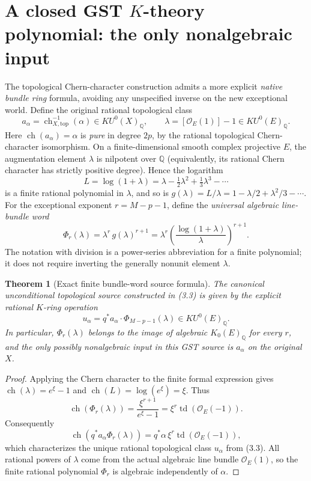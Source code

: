 \documentclass[11pt]{article}
\newcommand{\Q}{\mathbb Q}
\newcommand{\td}{\operatorname{td}}
\newcommand{\ch}{\operatorname{ch}}
\newtheorem{theorem}{Theorem}[section]
\begin{document}
\section{A closed GST \(K\)-theory polynomial: the only nonalgebraic input}
The topological Chern-character construction admits a more
explicit \emph{native bundle ring} formula, avoiding any
unspecified inverse on the new exceptional world.
Define the original rational topological class
\[
 a_\alpha=\ch_{X,\mathrm{top}}^{-1}(\alpha)
 \in KU^0(X)_\Q,\qquad
 \lambda=[\mathcal O_E(1)]-1
 \in KU^0(E)_\Q.
\]
Here \(\ch(a_\alpha)=\alpha\) is \emph{pure}
in degree \(2p\), by the rational topological
Chern-character isomorphism. On a finite-dimensional
smooth complex projective \(E\), the
augmentation element \(\lambda\) is nilpotent
over \(\Q\) (equivalently, its rational
Chern character has strictly positive degree).
Hence the logarithm
\[
 L=\log(1+\lambda)
  =\lambda-\tfrac12\lambda^2+
   \tfrac13\lambda^3-\cdots
\]
is a finite rational polynomial in
\(\lambda\), and so is
\(g(\lambda)=L/\lambda=
1-\lambda/2+\lambda^2/3-\cdots\).
For the exceptional exponent \(r=M-p-1\),
define the \emph{universal algebraic line-bundle
word}
\[
 \boxed{
 \Phi_r(\lambda)
 =\lambda^r\,g(\lambda)^{r+1}
 =\lambda^r
 \left(\frac{\log(1+\lambda)}{\lambda}\right)^{r+1}.}
 \tag{5.1}
\]
The notation with division is a power-series
abbreviation for a finite polynomial; it
does not require inverting the generally
nonunit element \(\lambda\).

\begin{theorem}[Exact finite bundle-word source formula]
The canonical unconditional topological source
constructed in (3.3) is given by the
\emph{explicit rational \(K\)-ring operation}
\[
 \boxed{
  u_\alpha=q^*a_\alpha\cdot\Phi_{M-p-1}(\lambda)
 \in KU^0(E)_\Q.}
 \tag{5.2}
\]
In particular, \(\Phi_r(\lambda)\) belongs to the image
of \emph{algebraic} \(K_0(E)_\Q\)
for every \(r\), and the only possibly
nonalgebraic input in this GST source is
\(a_\alpha\) on the original \(X\).
\end{theorem}
\begin{proof}
Applying the Chern character to the finite
formal expression gives
\(\ch(\lambda)=e^\xi-1\) and
\(\ch(L)=\log(e^\xi)=\xi\).
Thus
\[
 \ch(\Phi_r(\lambda))
 =\frac{\xi^{r+1}}{e^\xi-1}
 =\xi^r\td(\mathcal O_E(-1)).
\]
Consequently
\[
 \ch(q^*a_\alpha\Phi_r(\lambda))
 =q^*\alpha\,\xi^r\td(\mathcal O_E(-1)),
\]
which characterizes the unique rational
topological class \(u_\alpha\) from (3.3).
All rational powers of \(\lambda\) come from
the actual algebraic line bundle
\(\mathcal O_E(1)\), so the finite
rational polynomial \(\Phi_r\) is
algebraic independently of \(\alpha\).
\end{proof}
\end{document}
